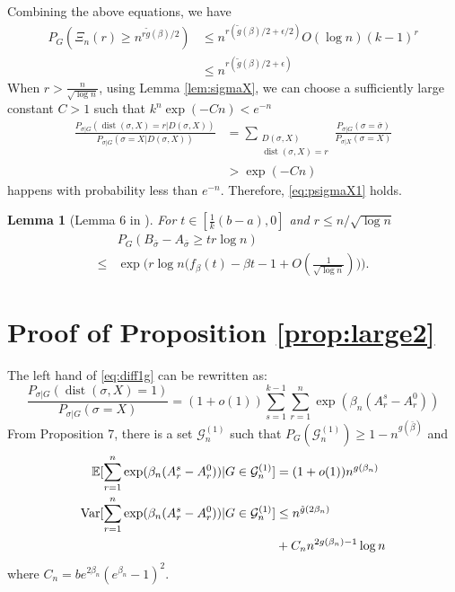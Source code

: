 \documentclass[journal]{IEEEtran}
\newtheorem{lemma}{Lemma}
\newcommand{\cG}{\mathcal{G}}
\newcommand{\1}{\mathbbm{1}}
\DeclareMathOperator{\Var}{Var}
\DeclareMathOperator{\dist}{dist}
\begin{document}
Combining the above equations, we have
\begin{align*}
P_{G}(\Xi_n(r) \geq n^{r \tilde{g}(\beta) /2}) &\leq  n^{r(\tilde{g}(\beta)/2 + \epsilon/2)} O(\log n) (k-1)^r\\
&\leq n^{r(\tilde{g}(\beta)/2 + \epsilon)}
\end{align*}
When $r>\frac{n}{\sqrt{\log n}}$, using Lemma \ref{lem:sigmaX}, we can choose a sufficiently large constant $C>1$
such that $k^n\exp(-Cn) < e^{-n}$
\begin{align*}
\frac{P_{\sigma|G}(\dist(\sigma, X)=r | D(\sigma, X))}
{P_{\sigma|G}(\sigma=X | D(\sigma, X))} &= \sum_{\substack{D(\sigma, X) \\ \dist(\sigma, X)=r}} \frac{P_{\sigma | G}(\sigma = \bar{\sigma}) }{P_{\sigma | X}(\sigma = X)} \\
&> \exp(-Cn)
\end{align*}
happens with probability less than $e^{-n}$. Therefore, \eqref{eq:psigmaX1} holds.
\begin{lemma}[Lemma 6 in \cite{sibmmc}]\label{lem:enhanced_fb}
	For $t\in [\frac{1}{k}(b-a), 0]$
	and $ r \le n/\sqrt{\log n}$
	\begin{equation} \label{eq:upmpt}
	\begin{aligned}
	& P_G(B_{\bar{\sigma}}-A_{\bar{\sigma}}\ge t r \log n)  \\
	\le & \exp\Big(r\log n
	\Big(f_{\beta}(t) - \beta t -1	+ O(\frac{1}{\sqrt{\log n}}) \Big)\Big) .
	\end{aligned}
	\end{equation}
\end{lemma}
\section*{Proof of Proposition \ref{prop:large2}}
The left hand of \eqref{eq:diff1g} can be rewritten as:
\begin{equation}\label{eq:knd}
	\frac{P_{\sigma|G}(\dist(\sigma, X)=1)}
{P_{\sigma|G}(\sigma=X)}= (1+o(1))\sum_{s=1}^{k-1}\sum_{r=1}^n \exp(\beta_n (A_r^s - A_r^0))
\end{equation}
From Proposition 7, there is a set $\cG^{(1)}_n$ such that $P_G(\cG^{(1)}_n) \geq 1-n^{g(\bar{\beta})}$
and
\begin{align}
\mathbb{E}[\sum_{r=1}^n \exp(\beta_n (A_r^s - A_r^0)) | G \in \cG^{(1)}_n] &= (1+o(1))n^{g(\beta_n)} \\
\Var[\sum_{r=1}^n \exp(\beta_n (A_r^s - A_r^0)) | G \in \cG^{(1)}_n] &\leq n^{\tilde{g}(2\beta_n)} \notag \\
&+ C_n n^{2g(\beta_n)-1}\log n
\end{align}
where $C_n = be^{2\beta_n}(e^{\beta_n}-1)^2$.
\end{document}
